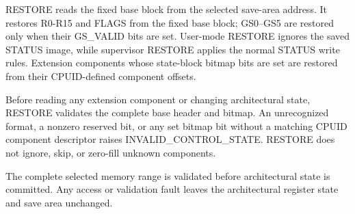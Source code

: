 RESTORE reads the fixed base block from the selected save-area address. It restores R0-R15 and FLAGS from the fixed base block; GS0--GS5 are restored only when their GS\_VALID bits are set. User-mode RESTORE ignores the saved STATUS image, while supervisor RESTORE applies the normal STATUS write rules. Extension components whose state-block bitmap bits are set are restored from their CPUID-defined component offsets.

Before reading any extension component or changing architectural state, RESTORE validates the complete base header and bitmap. An unrecognized format, a nonzero reserved bit, or any set bitmap bit without a matching CPUID component descriptor raises INVALID\_CONTROL\_STATE. RESTORE does not ignore, skip, or zero-fill unknown components.

The complete selected memory range is validated before architectural state is committed. Any access or validation fault leaves the architectural register state and save area unchanged.
